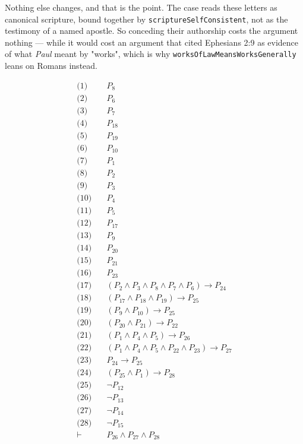 \documentclass[11pt]{article}
\begin{document}
Nothing else changes, and that is the point. The case reads these letters as canonical scripture, bound together by \texttt{scripture\allowbreak{}Self\allowbreak{}Consistent}, not as the testimony of a named apostle. So conceding their authorship costs the argument nothing — while it would cost an argument that cited Ephesians 2:9 as evidence of what \emph{Paul} meant by "works", which is why \texttt{works\allowbreak{}Of\allowbreak{}Law\allowbreak{}Means\allowbreak{}Works\allowbreak{}Generally} leans on Romans instead.

\begin{align*}
  \text{(1)} \quad & P_{8} \\
  \text{(2)} \quad & P_{6} \\
  \text{(3)} \quad & P_{7} \\
  \text{(4)} \quad & P_{18} \\
  \text{(5)} \quad & P_{19} \\
  \text{(6)} \quad & P_{10} \\
  \text{(7)} \quad & P_{1} \\
  \text{(8)} \quad & P_{2} \\
  \text{(9)} \quad & P_{3} \\
  \text{(10)} \quad & P_{4} \\
  \text{(11)} \quad & P_{5} \\
  \text{(12)} \quad & P_{17} \\
  \text{(13)} \quad & P_{9} \\
  \text{(14)} \quad & P_{20} \\
  \text{(15)} \quad & P_{21} \\
  \text{(16)} \quad & P_{23} \\
  \text{(17)} \quad & (P_{2} \land P_{3} \land P_{8} \land P_{7} \land P_{6}) \rightarrow P_{24} \\
  \text{(18)} \quad & (P_{17} \land P_{18} \land P_{19}) \rightarrow P_{25} \\
  \text{(19)} \quad & (P_{9} \land P_{10}) \rightarrow P_{25} \\
  \text{(20)} \quad & (P_{20} \land P_{21}) \rightarrow P_{22} \\
  \text{(21)} \quad & (P_{1} \land P_{4} \land P_{5}) \rightarrow P_{26} \\
  \text{(22)} \quad & (P_{1} \land P_{4} \land P_{5} \land P_{22} \land P_{23}) \rightarrow P_{27} \\
  \text{(23)} \quad & P_{24} \rightarrow P_{25} \\
  \text{(24)} \quad & (P_{25} \land P_{1}) \rightarrow P_{28} \\
  \text{(25)} \quad & \lnot P_{12} \\
  \text{(26)} \quad & \lnot P_{13} \\
  \text{(27)} \quad & \lnot P_{14} \\
  \text{(28)} \quad & \lnot P_{15} \\
  \vdash \quad & P_{26} \land P_{27} \land P_{28}
\end{align*}
\end{document}
